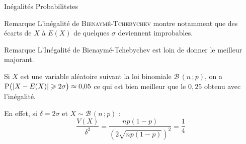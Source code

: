 \documentclass{cours}
\begin{document}
\begin{Gpartie}{Inégalités Probabilitstes}
\begin{Spartie}{Remarque}
            L'inégalité de \textsc{Bienaymé-Tchebychev} montre notamment que des écarts de $X$ à $E(X)$ de quelques $\sigma$ deviennent improbables.
        \end{Spartie}
        \begin{Spartie}{Remarque} 
            L'Inégalité de Bienaymé-Tchebychev est loin de donner le meilleur majorant.

            Si $X$ est une variable aléatoire suivant la loi binomiale $\mathcal{B}\,\left(n\,; p\right)$, on a $\mathrm{P}\big(\vert X-E(X)\rvert\geqslant 2\sigma\big)\approx 0{,}05$ ce qui est bien meilleur que le $0{,}25$ obtenu avec l'inégalité.

            En effet, si $\delta=2\sigma$ et $X\sim\mathcal{B}\,(n\,; p)$ : \[\frac{V(X)}{\delta^2}=\frac{np(1-p)}{\left(2\sqrt{np(1-p)}\right)^2}=\frac{1}{4}\]
        \end{Spartie}
    \end{Gpartie}
    \pagebreak
\end{document}
